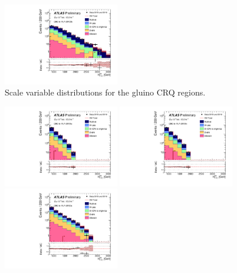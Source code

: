 \begin{figure}[tbp]
\begin{center}
\includegraphics[width=0.45\textwidth]{figures/ATLAS-CONF-2016-078_INT/N-1Plots/AtlasStyle/Preliminary/CRQ_SRJigsawSRG3b_LastCut_CRQ_minusone}
\end{center}
\caption{Scale variable distributions for the gluino CRQ regions.}
\label{fig:CRQ_SRJigsawSRG1a_LastCut_CRQ_minusone}
\end{figure}

\begin{figure}[tbp]
\begin{center}
\includegraphics[width=0.45\textwidth]{figures/ATLAS-CONF-2016-078_INT/N-1Plots/AtlasStyle/Preliminary/CRQ_SRJigsawSRS1a_LastCut_CRQ_minusone}
\includegraphics[width=0.45\textwidth]{figures/ATLAS-CONF-2016-078_INT/N-1Plots/AtlasStyle/Preliminary/CRQ_SRJigsawSRS1b_LastCut_CRQ_minusone}
\includegraphics[width=0.45\textwidth]{figures/ATLAS-CONF-2016-078_INT/N-1Plots/AtlasStyle/Preliminary/CRQ_SRJigsawSRS2a_LastCut_CRQ_minusone}

\end{center}
\end{figure}
